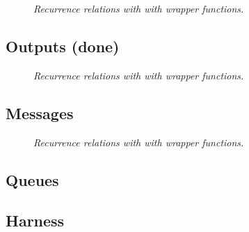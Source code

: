 \documentclass{article}
\begin{document}
\begin{figure}[H]
	\centering
	
	\caption{\it Recurrence relations with with wrapper functions.}
	\label{fig:RRwfc}
\end{figure} 

\subsection{Outputs (done)}

\begin{figure}[H]
	\centering
	
	\caption{\it Recurrence relations with with wrapper functions.}
	\label{fig:RRopts}
\end{figure} 


\subsection{Messages}

\begin{figure}[H]
	\centering
	
	\caption{\it Recurrence relations with with wrapper functions.}
	\label{fig:RRmes5}
\end{figure} 

\subsection{Queues}



\subsection{Harness}



\end{document}

